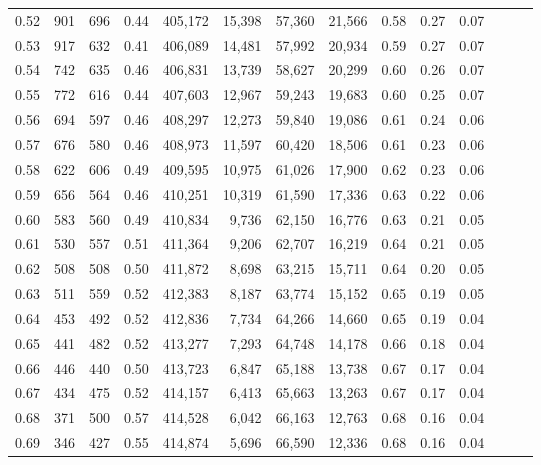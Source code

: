 \begin{tabular}{rrrrrrrrrrrrrr}
0.52 &     901 &    696 &  0.44 &  405,172 &   15,398 &  57,360 &  21,566 &  0.58 &  0.27 &      0.07 \\
0.53 &     917 &    632 &  0.41 &  406,089 &   14,481 &  57,992 &  20,934 &  0.59 &  0.27 &      0.07 \\
0.54 &     742 &    635 &  0.46 &  406,831 &   13,739 &  58,627 &  20,299 &  0.60 &  0.26 &      0.07 \\
0.55 &     772 &    616 &  0.44 &  407,603 &   12,967 &  59,243 &  19,683 &  0.60 &  0.25 &      0.07 \\
0.56 &     694 &    597 &  0.46 &  408,297 &   12,273 &  59,840 &  19,086 &  0.61 &  0.24 &      0.06 \\
0.57 &     676 &    580 &  0.46 &  408,973 &   11,597 &  60,420 &  18,506 &  0.61 &  0.23 &      0.06 \\
0.58 &     622 &    606 &  0.49 &  409,595 &   10,975 &  61,026 &  17,900 &  0.62 &  0.23 &      0.06 \\
0.59 &     656 &    564 &  0.46 &  410,251 &   10,319 &  61,590 &  17,336 &  0.63 &  0.22 &      0.06 \\
0.60 &     583 &    560 &  0.49 &  410,834 &    9,736 &  62,150 &  16,776 &  0.63 &  0.21 &      0.05 \\
0.61 &     530 &    557 &  0.51 &  411,364 &    9,206 &  62,707 &  16,219 &  0.64 &  0.21 &      0.05 \\
0.62 &     508 &    508 &  0.50 &  411,872 &    8,698 &  63,215 &  15,711 &  0.64 &  0.20 &      0.05 \\
0.63 &     511 &    559 &  0.52 &  412,383 &    8,187 &  63,774 &  15,152 &  0.65 &  0.19 &      0.05 \\
0.64 &     453 &    492 &  0.52 &  412,836 &    7,734 &  64,266 &  14,660 &  0.65 &  0.19 &      0.04 \\
0.65 &     441 &    482 &  0.52 &  413,277 &    7,293 &  64,748 &  14,178 &  0.66 &  0.18 &      0.04 \\
0.66 &     446 &    440 &  0.50 &  413,723 &    6,847 &  65,188 &  13,738 &  0.67 &  0.17 &      0.04 \\
0.67 &     434 &    475 &  0.52 &  414,157 &    6,413 &  65,663 &  13,263 &  0.67 &  0.17 &      0.04 \\
0.68 &     371 &    500 &  0.57 &  414,528 &    6,042 &  66,163 &  12,763 &  0.68 &  0.16 &      0.04 \\
0.69 &     346 &    427 &  0.55 &  414,874 &    5,696 &  66,590 &  12,336 &  0.68 &  0.16 &      0.04 \\

\end{tabular}
